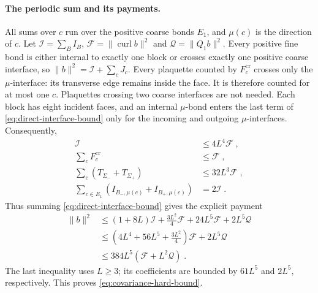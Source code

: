 \documentclass[11pt]{article}
\begin{document}
\paragraph{The periodic sum and its payments.}
All sums over $c$ run over the positive coarse bonds $E_1$, and $\mu(c)$ is the direction of $c$. Let $\mathscr I=\sum_B I_B$, $\mathscr F=\|\operatorname{curl}b\|^2$ and $\mathscr Q=\|Q_1b\|^2$. Every positive fine bond is either internal to exactly one block or crosses exactly one positive coarse interface, so $\|b\|^2=\mathscr I+\sum_cJ_c$. Every plaquette counted by $F_c^{\mathrm{cr}}$ crosses only the $\mu$-interface: its transverse edge remains inside the face. It is therefore counted for at most one $c$. Plaquettes crossing two coarse interfaces are not needed. Each block has eight incident faces, and an internal $\mu$-bond enters the last term of \eqref{eq:direct-interface-bound} only for the incoming and outgoing $\mu$-interfaces. Consequently,
\begin{equation}\label{eq:direct-interface-incidences}
    \begin{aligned}
        \mathscr I&\leq 4L^4\mathscr F\;,\\
        \sum_cF_c^{\mathrm{cr}}&\leq \mathscr F\;,\\
        \sum_c(T_{\Sigma_-}+T_{\Sigma_+})&\leq 32L^3\mathscr F\;,\\
        \sum_{c \in E_1}
            (I_{B_-,\mu(c)}+I_{B_+,\mu(c)})&=2\mathscr I\;.
    \end{aligned}
\end{equation}
Thus summing \eqref{eq:direct-interface-bound} gives the explicit payment
\begin{equation}\label{eq:direct-hard-bound-payment}
    \begin{aligned}
        \|b\|^2
        &\leq (1+8L)\mathscr I
            +\frac{3L^2}{4}\mathscr F
            +24L^5\mathscr F+2L^5\mathscr Q\\
        &\leq \left(4L^4+56L^5+\frac{3L^2}{4}\right)\mathscr F
            +2L^5\mathscr Q\\
        &\leq 384L^5(\mathscr F+L^2\mathscr Q)\;.
    \end{aligned}
\end{equation}
The last inequality uses $L\geq 3$; its coefficients are bounded by $61L^5$ and $2L^5$, respectively. This proves \eqref{eq:covariance-hard-bound}.
\end{document}
